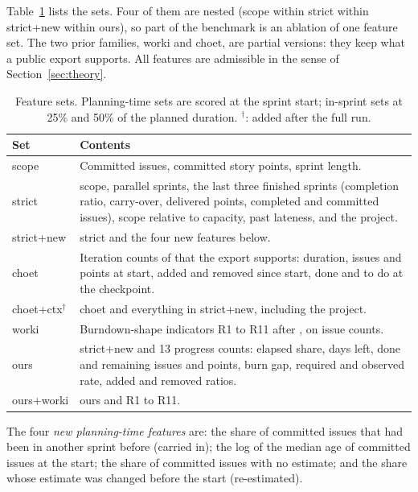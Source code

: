 Table~\ref{tab:families} lists the sets. Four of them are nested (scope within strict within strict+new within ours), so part of the benchmark is an ablation of one feature set. The two prior families, worki and choet, are partial versions: they keep what a public export supports. All features are admissible in the sense of Section~\ref{sec:theory}.

\begin{table}[t]
\centering
\small
\caption{Feature sets. Planning-time sets are scored at the sprint start; in-sprint sets at 25\% and 50\% of the planned duration. $^{\dagger}$: added after the full run.}
\label{tab:families}
\begin{tabular}{@{}p{1.6cm}p{6.3cm}@{}}
\toprule
Set & Contents \\
\midrule
scope & Committed issues, committed story points, sprint length. \\
strict & scope, parallel sprints, the last three finished sprints (completion ratio, carry-over, delivered points, completed and committed issues), scope relative to capacity, past lateness, and the project. \\
strict+new & strict and the four new features below. \\
choet & Iteration counts of \cite{choet2018} that the export supports: duration, issues and points at start, added and removed since start, done and to do at the checkpoint. \\
choet+ctx$^{\dagger}$ & choet and everything in strict+new, including the project. \\
worki & Burndown-shape indicators R1 to R11 after \cite{perez2024}, on issue counts. \\
ours & strict+new and 13 progress counts: elapsed share, days left, done and remaining issues and points, burn gap, required and observed rate, added and removed ratios. \\
ours+worki & ours and R1 to R11. \\
\bottomrule
\end{tabular}
\end{table}

The four \emph{new planning-time features} are: the share of committed issues that had been in another sprint before (carried in); the log of the median age of committed issues at the start; the share of committed issues with no estimate; and the share whose estimate was changed before the start (re-estimated).

